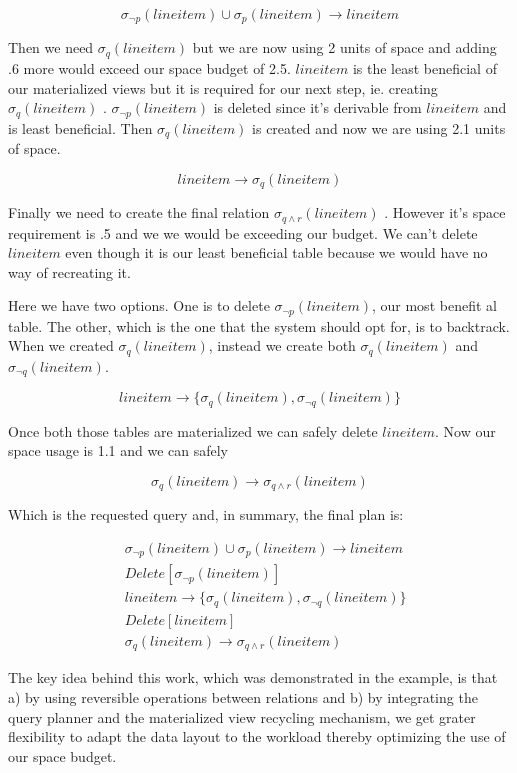\[
  \sigma_{\neg p}(lineitem) \cup \sigma_{p}(lineitem) \rightarrow lineitem
\]

Then we need \(\sigma_{q}(lineitem)\) but we are now using 2 units of
space and adding .6 more would exceed our space budget of
2.5. \(lineitem\) is the least beneficial of our materialized views
but it is required for our next step, ie. creating
\(\sigma_{q}(lineitem)\) . \(\sigma_{\neg p}(lineitem)\) is deleted
since it's derivable from \(lineitem\) and is least beneficial. Then
\(\sigma_{q}(lineitem)\) is created and now we are using 2.1 units of
space.

\[
  lineitem \rightarrow \sigma_{q}(lineitem)
\]

Finally we need to create the final relation \(\sigma_{q \land
  r}(lineitem)\) . However it's space requirement is .5 and we we would
be exceeding our budget. We can't delete \(lineitem\) even though it
is our least beneficial table because we would have no way of
recreating it.

Here we have two options. One is to delete \(\sigma_{\neg
  p}(lineitem)\), our most benefit al table. The other, which is the one
that the system should opt for, is to backtrack. When we created
\(\sigma_{q}(lineitem)\), instead we create both
\(\sigma_{q}(lineitem)\) and \(\sigma_{\neg q}(lineitem)\).

\[
  lineitem \rightarrow \{\sigma_{q}(lineitem), \sigma_{\neg q}(lineitem)\}
\]

Once both those tables are materialized we can safely delete
\(lineitem\). Now our space usage is 1.1 and we can safely

\[
  \sigma_{q}(lineitem) \rightarrow \sigma_{q \land r} (lineitem)
\]

Which is the requested query and, in summary, the final plan is:

\begin{align*}
  &\sigma_{\neg p}(lineitem) \cup \sigma_{p}(lineitem) \rightarrow lineitem \\
  &Delete[\sigma_{\neg p}(lineitem)] \\
  &lineitem \rightarrow \{\sigma_{q}(lineitem), \sigma_{\neg q}(lineitem)\} \\
  &Delete[lineitem] \\
  &\sigma_{q}(lineitem) \rightarrow \sigma_{q \land r} (lineitem)
\end{align*}

The key idea behind this work, which was demonstrated in the example,
is that a) by using reversible operations between relations and b) by
integrating the query planner and the materialized view recycling
mechanism, we get grater flexibility to adapt the data layout to the workload thereby
optimizing the use of our space budget.


